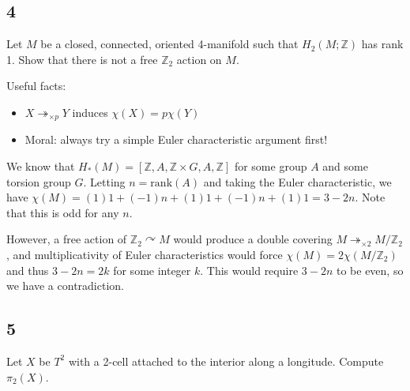 \hypertarget{section-3}{%
\subsection{4}\label{section-3}}

Let \(M\) be a closed, connected, oriented 4-manifold such that
\(H_2(M; {\mathbb{Z}})\) has rank 1. Show that there is not a free
\({\mathbb{Z}}_2\) action on \(M\).

\begin{solution}

Useful facts:

\begin{itemize}
\tightlist
\item
  \(X \twoheadrightarrow_{\times p} Y\) induces \(\chi(X) = p\chi(Y)\)
\item
  Moral: always try a simple Euler characteristic argument first!
\end{itemize}

We know that
\(H_*(M) = [{\mathbb{Z}}, A, {\mathbb{Z}}\times G, A, {\mathbb{Z}}]\)
for some group \(A\) and some torsion group \(G\). Letting
\(n=\mathrm{rank}(A)\) and taking the Euler characteristic, we have
\(\chi(M) = (1)1 + (-1)n + (1)1 + (-1)n + (1)1 = 3-2n\). Note that this
is odd for any \(n\).

However, a free action of \({\mathbb{Z}}_2 \curvearrowright M\) would
produce a double covering
\(M \twoheadrightarrow_{\times 2} M/{\mathbb{Z}}_2\), and
multiplicativity of Euler characteristics would force
\(\chi(M) = 2 \chi(M/{\mathbb{Z}}_2)\) and thus \(3-2n = 2k\) for some
integer \(k\). This would require \(3-2n\) to be even, so we have a
contradiction.

\end{solution}

\hypertarget{section-4}{%
\subsection{5}\label{section-4}}

Let \(X\) be \(T^2\) with a 2-cell attached to the interior along a
longitude. Compute \(\pi_2(X)\).

